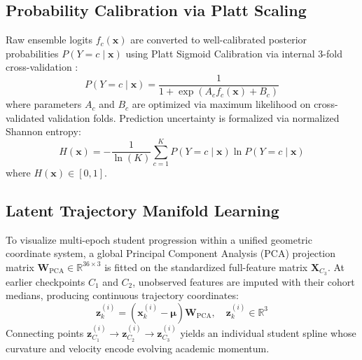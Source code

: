 \documentclass[conference]{IEEEtran}
\begin{document}
\subsection{Probability Calibration via Platt Scaling}
Raw ensemble logits $f_c(\mathbf{x})$ are converted to well-calibrated posterior probabilities $P(Y=c \mid \mathbf{x})$ using Platt Sigmoid Calibration via internal 3-fold cross-validation \cite{platt1999probabilistic, pedregosa2011scikit}:
\begin{equation}
    P(Y=c \mid \mathbf{x}) = \frac{1}{1 + \exp\left(A_c f_c(\mathbf{x}) + B_c\right)}
\end{equation}
where parameters $A_c$ and $B_c$ are optimized via maximum likelihood on cross-validated validation folds. Prediction uncertainty is formalized via normalized Shannon entropy:
\begin{equation}
    H(\mathbf{x}) = -\frac{1}{\ln(K)} \sum_{c=1}^K P(Y=c \mid \mathbf{x}) \ln P(Y=c \mid \mathbf{x})
\end{equation}
where $H(\mathbf{x}) \in [0, 1]$.

\subsection{Latent Trajectory Manifold Learning}
To visualize multi-epoch student progression within a unified geometric coordinate system, a global Principal Component Analysis (PCA) projection matrix $\mathbf{W}_{\text{PCA}} \in \mathbb{R}^{36 \times 3}$ is fitted on the standardized full-feature matrix $\mathbf{X}_{C_3}$. At earlier checkpoints $C_1$ and $C_2$, unobserved features are imputed with their cohort medians, producing continuous trajectory coordinates:
\begin{equation}
    \mathbf{z}_k^{(i)} = \left(\mathbf{x}_k^{(i)} - \boldsymbol{\mu}\right) \mathbf{W}_{\text{PCA}}, \quad \mathbf{z}_k^{(i)} \in \mathbb{R}^{3}
\end{equation}
Connecting points $\mathbf{z}_{C_1}^{(i)} \to \mathbf{z}_{C_2}^{(i)} \to \mathbf{z}_{C_3}^{(i)}$ yields an individual student spline whose curvature and velocity encode evolving academic momentum.
\end{document}
